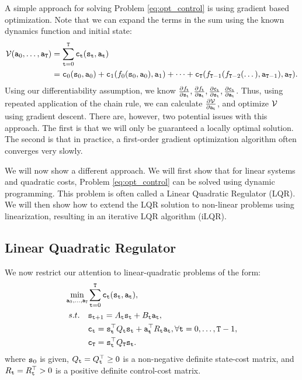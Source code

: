 A simple approach for solving Problem \ref{eq:opt_control} is using gradient based optimization. Note that we can expand the terms in the sum using the known dynamics function and initial state:
\begin{equation*}
\begin{split}
        \mathcal{V}({\tt a}_0,\dots,{\tt a}_{\tt T}) &= \sum_{{\tt t}=0}^{\tt T} {\tt c}_{\tt t}({\tt s}_{\tt t}, {\tt a}_{\tt t}) \\
        & = {\tt c}_0({\tt s}_0, {\tt a}_0) + {\tt c}_1(f_0({\tt s}_0,{\tt a}_0), {\tt a}_1) + \dots + {\tt c}_{\tt T}(f_{{\tt T} - 1}(f_{{\tt T} - 2}(\dots ),{\tt a}_{{\tt T}-1}), {\tt a}_{\tt T}).
\end{split}
\end{equation*}
Using our differentiability assumption, we know $\frac{\partial f_{\tt t}}{\partial {\tt s}_{\tt t}}, \frac{\partial f_{\tt t}}{\partial {\tt a}_{\tt t}}, \frac{\partial {\tt c}_{\tt t}}{\partial {\tt s}_{\tt t}}, \frac{\partial {\tt c}_{\tt t}}{\partial {\tt a}_{\tt t}}$. Thus, using repeated application of the chain rule, we can calculate $\frac{\partial \mathcal{V}}{\partial {\tt a}_{\tt t}}$, and optimize $\mathcal{V}$ using gradient descent. There are, however, two potential issues with this approach. The first is that we will only be guaranteed a locally optimal solution. The second is that in practice, a first-order gradient optimization algorithm often converges very slowly.

We will now show a different approach. We will first show that for linear systems and quadratic costs, Problem \ref{eq:opt_control} can be solved using dynamic programming. This problem is often called a Linear Quadratic Regulator (LQR). We will then show how to extend the LQR solution to non-linear problems using linearization, resulting in an iterative LQR algorithm (iLQR).

\subsection{Linear Quadratic Regulator}

We now restrict our attention to linear-quadratic problems of the form:
\begin{equation}\label{eq:lqr}
    \begin{split}
        \min_{{\tt a}_0,\dots,{\tt a}_{{\tt T}}} & \sum_{{\tt t}=0}^{\tt T} {\tt c}_{\tt t}({\tt s}_{\tt t}, {\tt a}_{\tt t}), \\
        s.t. \quad & {{\tt s}_{{\tt t}+1}} = A_{\tt t} {\tt s}_{\tt t} + B_{\tt t} {\tt a}_{\tt t}, \\
        & {\tt c}_{\tt t} = {\tt s}_{\tt t}^\top Q_{\tt t} {\tt s}_{\tt t} + {\tt a}_{\tt t}^\top R_{\tt t} {\tt a}_{\tt t}, \forall {\tt t}=0,\dots,{\tt T}-1, \\
        & {\tt c}_{\tt T} = {\tt s}_{\tt t}^\top Q_{\tt T} {\tt s}_{\tt t}.
    \end{split}
\end{equation}
where ${\tt s}_0$ is given, $Q_{\tt t}=Q_{\tt t}^\top \geq 0$ is a non-negative definite state-cost matrix, and $R_{\tt t} = R_{\tt t}^\top > 0 $ is a positive definite control-cost matrix.

